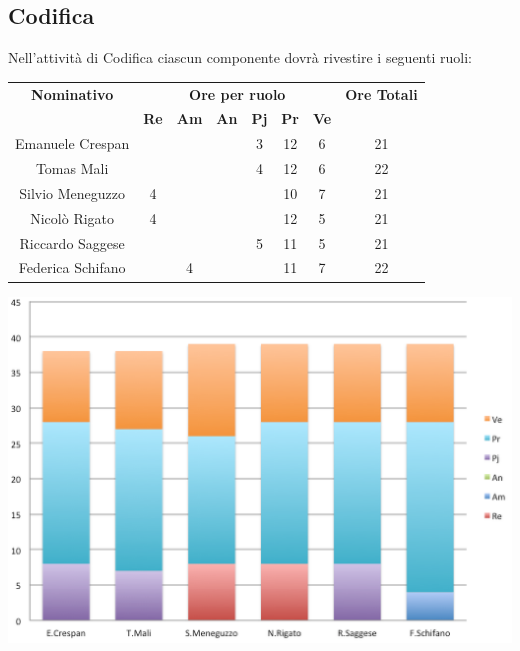 \subsection{Codifica}
Nell’attività di Codifica ciascun componente dovrà rivestire i seguenti ruoli:
\begin{center}
  \centering
  \begin{tabular} {|c|c|c|c|c|c|c|c|}
    \hline
    \textbf{Nominativo} & \multicolumn{6}{|c|}{\textbf{Ore per ruolo}} & \textbf{Ore Totali} \\
    & \textbf{Re} & \textbf{Am} & \textbf{An} & \textbf{Pj} & \textbf{Pr} & \textbf{Ve} & \\
    \hline
    Emanuele Crespan & & & &3 &12 &6 &21\\
    \hline
    Tomas Mali & & & &4 &12 &6 &22\\
    \hline
    Silvio Meneguzzo &4 & & & &10 &7 &21\\
    \hline
    Nicolò Rigato &4 & & & &12 &5 &21\\
    \hline
    Riccardo Saggese & & & &5 &11 &5 &21\\
    \hline
    Federica Schifano & &4 & & &11 &7 &22\\
    \hline
  \end{tabular}
  \includegraphics[scale=0.65]{img/fig5.png}
\end{center}

